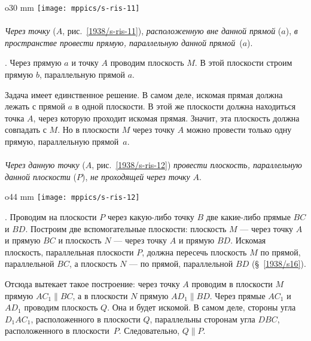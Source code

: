 \begin{wrapfigure}{o}{30 mm}
\centering
\vskip-0mm
\texttt{[image: mppics/s-ris-11]}
\caption{}\label{1938/s-ris-11}
\end{wrapfigure}

\paragraph{}\label{1938/s19}
\emph{Через точку} ($A$, рис.~\ref{1938/s-ris-11}), \emph{расположенную вне данной прямой} ($a$), \emph{в пространстве провести прямую, параллельную данной прямой}~($a$).


\medskip

\mbox{.}
Через прямую $a$ и точку $A$ проводим плоскость $M$.
В этой плоскости строим прямую $b$, параллельную прямой $a$.

Задача имеет единственное решение.
В самом деле, искомая прямая должна лежать с прямой $a$ в одной плоскости.
В этой же плоскости должна находиться точка $A$, через которую проходит искомая прямая.
Значит, эта плоскость должна совпадать с $M$.
Но в плоскости $M$ через точку $A$ можно провести только одну прямую, параллельную прямой~$a$.

\paragraph{}\label{1938/s20}
\emph{Через данную точку} ($A$, рис.~\ref{1938/s-ris-12}) \emph{провести плоскость, параллельную данной плоскости} ($P$), \emph{не проходящей через точку} $A$.

\begin{wrapfigure}{o}{44 mm}
\centering
\texttt{[image: mppics/s-ris-12]}
\caption{}\label{1938/s-ris-12}
\end{wrapfigure}

\mbox{.}
Проводим на плоскости $P$ через какую-либо точку $B$ две какие-либо прямые $BC$ и $BD$.
Построим две вспомогательные плоскости: плоскость $M$ — через точку $A$ и прямую $BC$ и плоскость $N$ — через точку $A$ и прямую $BD$.
Искомая плоскость, параллельная плоскости $P$, должна пересечь плоскость $M$ по прямой, параллельной $BC$, а плоскость $N$ — по прямой, параллельной $BD$ (§~\ref{1938/s16}).

Отсюда вытекает такое построение: через точку $A$ проводим в плоскости $M$ прямую $AC_1\parallel BC$, а в плоскости $N$ прямую $AD_1\parallel BD$.
Через прямые $AC_1$ и $AD_1$ проводим плоскость $Q$.
Она и будет искомой.
В самом деле, стороны угла $D_1AC_1$, расположенного в плоскости $Q$, параллельны сторонам угла $DBC$, расположенного в плоскости~$P$.
Следовательно, $Q\parallel P$.

